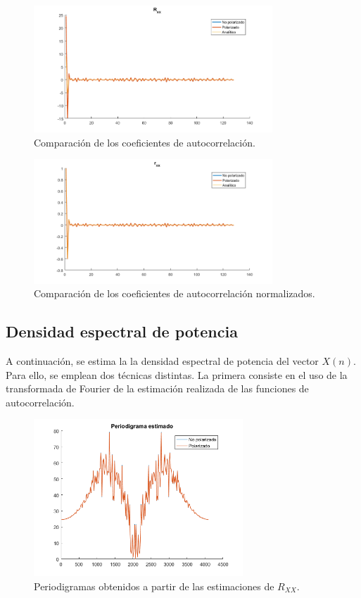 \begin{figure}[H]
\centering
	\includegraphics[width=0.8\textwidth, trim = {0 0 0 0.7cm},clip]{./ImagenesEjercicio2/Rxxcalc.png}
	\caption{Comparación de los coeficientes de autocorrelación.}
	\label{fig:Rxxcalc}
\end{figure}
\begin{figure}[H]
\centering
	\includegraphics[width=0.8\textwidth, trim = {0 0 0 0.7cm},clip]{./ImagenesEjercicio2/rrxxcalc.png}
	\caption{Comparación de los coeficientes de autocorrelación normalizados.}
	\label{fig:rrxxcalc2}
\end{figure}

\subsection{Densidad espectral de potencia}

A continuación, se estima la la densidad espectral de potencia del vector $X(n)$. Para ello, se emplean dos técnicas distintas. La primera consiste en el uso de la transformada de Fourier de la estimación realizada de las funciones de autocorrelación.
\begin{figure}[H]
\centering
	\includegraphics[width=0.7\textwidth, trim = {0 0 0 0.735cm},clip]{./ImagenesEjercicio2/period-est.png}
	\caption{Periodigramas obtenidos a partir de las estimaciones de $R_{XX}$.}
	\label{fig:period-est}
\end{figure}

